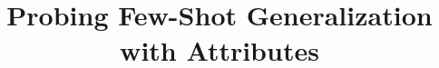 \documentclass{zgroup/zgroup} %
\title[]{Probing Few-Shot Generalization with Attributes}
\begin{document}
\maketitle

\vspace{-0.2in}
\begin{abstract}
    
\end{abstract}
\vspace{0.2in}










\appendix
\clearpage

\end{document}
